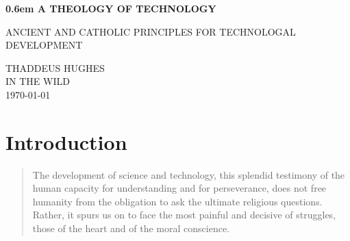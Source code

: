 \documentclass[letterpaper]{article}
\begin{document}
\clearpage
\newcommand\nbvspace[1][3]{\vspace*{\stretch{#1}}}

\newcommand{\nbstretchyspace}{\spaceskip0.5em plus 0.25em minus 0.25em}

\newcommand{\nbtitlestretch}{\spaceskip0.6em}
\thispagestyle{empty}
\pagestyle{plain}
\begin{center}
  \bfseries
  \nbvspace[1]
  \Huge
  {\nbtitlestretch\huge
    A THEOLOGY OF TECHNOLOGY}

  \nbvspace[1]
  \normalsize
  ANCIENT AND CATHOLIC PRINCIPLES FOR TECHNOLOGAL DEVELOPMENT\\

  \nbvspace[1]
  \nbvspace[2]

  \nbvspace[3]
  \normalsize

  \Large THADDEUS HUGHES\\


  \large
  IN THE WILD \\
  \small \MakeUppercase{\today} \\
\end{center}

\raggedbottom

\clearpage
\setcounter{page}{1}




\section{Introduction}

  \begin{quote}
    The development of science and technology, this splendid testimony of the human capacity for understanding and for perseverance, does not free humanity from the obligation to ask the ultimate religious questions. Rather, it spurs us on to face the most painful and decisive of struggles, those of the heart and of the moral conscience.
  \end{quote}
\end{document}
